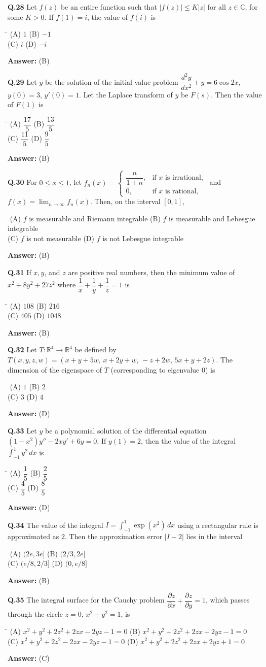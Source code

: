 \documentclass[11pt,a4paper]{article}
\newcommand{\optsfourA}[4]{%
  \begin{tabbing}
    \hspace{0.48\linewidth}\=\kill
    (A) #1 \> (B) #2 \\[2pt]
    (C) #3 \> (D) #4
  \end{tabbing}%
}
\newcommand{\ans}[1]{\textbf{Answer:} #1\par\medskip}
\begin{document}
\textbf{Q.28} Let $f(z)$ be an entire function such that $|f(z)| \le K|z|$ for all $z \in \mathbb{C}$, for some $K > 0$. If $f(1) = i$, the value of $f(i)$ is
\optsfourA{$1$}{$-1$}{$i$}{$-i$}
\ans{(B)}

\textbf{Q.29} Let $y$ be the solution of the initial value problem $\dfrac{d^2 y}{dx^2} + y = 6\cos 2x$, $y(0) = 3$, $y'(0) = 1$. Let the Laplace transform of $y$ be $F(s)$. Then the value of $F(1)$ is
\optsfourA{$\dfrac{17}{5}$}{$\dfrac{13}{5}$}{$\dfrac{11}{5}$}{$\dfrac{9}{5}$}
\ans{(B)}

\textbf{Q.30} For $0 \le x \le 1$, let $f_n(x) = \begin{cases} \dfrac{n}{1 + n}, & \text{if } x \text{ is irrational}, \\ 0, & \text{if } x \text{ is rational}, \end{cases}$ and $f(x) = \displaystyle\lim_{n\to\infty} f_n(x)$. Then, on the interval $[0, 1]$,
\optsfourA{$f$ is measurable and Riemann integrable}{$f$ is measurable and Lebesgue integrable}{$f$ is not measurable}{$f$ is not Lebesgue integrable}
\ans{(B)}

\textbf{Q.31} If $x, y$, and $z$ are positive real numbers, then the minimum value of $x^2 + 8y^2 + 27z^2$ where $\dfrac{1}{x} + \dfrac{1}{y} + \dfrac{1}{z} = 1$ is
\optsfourA{$108$}{$216$}{$405$}{$1048$}
\ans{(B)}

\textbf{Q.32} Let $T : \mathbb{R}^4 \to \mathbb{R}^4$ be defined by $T(x, y, z, w) = (x + y + 5w,\, x + 2y + w,\, -z + 2w,\, 5x + y + 2z)$. The dimension of the eigenspace of $T$ (corresponding to eigenvalue $0$) is
\optsfourA{$1$}{$2$}{$3$}{$4$}
\ans{(D)}

\textbf{Q.33} Let $y$ be a polynomial solution of the differential equation $(1 - x^2)y'' - 2xy' + 6y = 0$. If $y(1) = 2$, then the value of the integral $\displaystyle\int_{-1}^{1} y^2\,dx$ is
\optsfourA{$\dfrac{1}{5}$}{$\dfrac{2}{5}$}{$\dfrac{4}{5}$}{$\dfrac{8}{5}$}
\ans{(D)}

\textbf{Q.34} The value of the integral $I = \displaystyle\int_{-1}^{1} \exp(x^2)\,dx$ using a rectangular rule is approximated as $2$. Then the approximation error $|I - 2|$ lies in the interval
\optsfourA{$(2e, 3e]$}{$(2/3, 2e]$}{$(e/8, 2/3]$}{$(0, e/8]$}
\ans{(B)}

\textbf{Q.35} The integral surface for the Cauchy problem $\dfrac{\partial z}{\partial x} + \dfrac{\partial z}{\partial y} = 1$, which passes through the circle $z = 0$, $x^2 + y^2 = 1$, is
\optsfourA{$x^2 + y^2 + 2z^2 + 2zx - 2yz - 1 = 0$}{$x^2 + y^2 + 2z^2 + 2zx + 2yz - 1 = 0$}{$x^2 + y^2 + 2z^2 - 2zx - 2yz - 1 = 0$}{$x^2 + y^2 + 2z^2 + 2zx + 2yz + 1 = 0$}
\ans{(C)}
\end{document}
